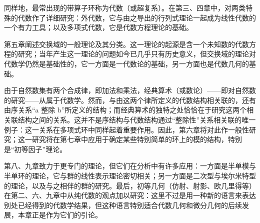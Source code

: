 同样地，最常出现的带算子环称为代数（或超复系）。在第三、四章中，对两类特殊的代数作了详细研究：外代数，它与由之导出的行列式理论一起成为线性代数的一个有力工具；以及多项式代数，它是代数方程理论的基础。

第五章阐述交换域的一般理论及其分类。这一理论的起源是含一个未知数的代数方程的研究；当年产生这一理论的问题如今已几乎只有历史意义，但交换域的理论对代数学仍然是基础性的，它一方面是一代数论的基础，另一方面也是代数几何的基础。

由于自然数集有两个合成律，即加法和乘法，经典算术（或数论）——即对自然数的研究——从属于代数学。然而，与由这两个律所定义的代数结构相关联的，还有由序关系“a 整除 b”所定义的结构；而经典算术的独特之处恰恰在于研究这两个相关联结构之间的关系。这并不是序结构与代数结构通过“整除性”关系相关联的唯一例子：这一关系在多项式环中同样起着重要作用。因此，第六章将对此作一般性研究；这一研究将在第七章中应用于确定某些特别简单的环上的模的结构，特别是“初等因子”理论。

第八、九章致力于更专门的理论，但它们在分析中有许多应用：一方面是半单模与半单环的理论，它与群的线性表示理论密切相关；另一方面是二次型与埃尔米特型的理论，以及与之相伴的群的研究。最后，初等几何（仿射、射影、欧几里得等）在第二、六、九章中从纯代数的观点加以研究：这里不过是用一种新的语言来表达别处已经得到的代数学结果，但这种语言特别适合代数几何和微分几何的后续发展，本章正是作为它们的引论。
